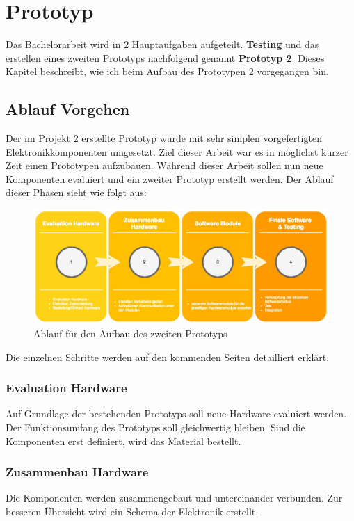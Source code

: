 \documentclass[11pt,english,german]{report}
\theoremstyle{definition}
\begin{document}
\chapter{Prototyp}
Das Bachelorarbeit wird in 2 Hauptaufgaben aufgeteilt.\textbf{ Testing} und das erstellen eines zweiten Prototyps nachfolgend genannt \textbf{Prototyp 2}. Dieses Kapitel beschreibt, wie ich beim Aufbau des Prototypen 2 vorgegangen bin.

\section{Ablauf Vorgehen}
Der im Projekt 2 erstellte Prototyp wurde mit sehr simplen vorgefertigten Elektronikkomponenten umgesetzt. Ziel dieser Arbeit war es in möglichst kurzer Zeit einen Prototypen aufzubauen. Während dieser Arbeit sollen nun neue Komponenten evaluiert und ein zweiter Prototyp erstellt werden. Der Ablauf dieser Phasen sieht wie folgt aus:\\[0.3cm]

\begin{figure}[h]
	\centering
	\includegraphics[width=\textwidth]{img/projectFlow_hardware.jpg}
	\caption[Flowchart Prototyp 2]
	{Ablauf für den Aufbau des zweiten Prototyps}
\end{figure}
\noindent
Die einzelnen Schritte werden auf den kommenden Seiten detailliert erklärt.

\subsection{Evaluation Hardware}
Auf Grundlage der bestehenden Prototyps soll neue Hardware evaluiert werden. Der Funktionsumfang des Prototyps soll gleichwertig bleiben. Sind die Komponenten erst definiert, wird das Material bestellt.

\subsection{Zusammenbau Hardware}
Die Komponenten werden zusammengebaut und untereinander verbunden. Zur besseren Übersicht wird ein Schema  der Elektronik erstellt.
\end{document}
